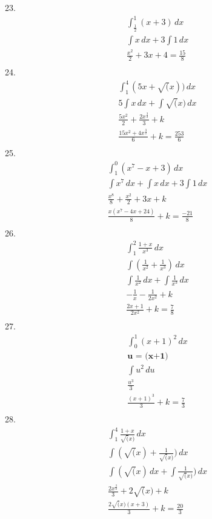 \documentclass{article}
\begin{document}
23.
\begin{gather*}
    \int_{\frac{1}{2}}^{1} (x+3)\, dx
\\
    \int x\, dx + 3\int 1\, dx
\\
    \frac{x^2}{2} + 3x + 4 = \frac{15}{8}
\\
\end{gather*}
24.
\begin{gather*}
    \int_{1}^{4} (5x + \sqrt(x))\, dx
\\
    5\int x\, dx + \int \sqrt(x)\, dx
\\
    \frac{5x^2}{2} + \frac{2x^{\frac{3}{2}}}{3} + k
\\
    \frac{15x^2 + 4x^{\frac{3}{2}}}{6} + k = \frac{253}{6}
\\
\end{gather*}
25.
\begin{gather*}
    \int_{1}^{0} (x^7 - x+3)\, dx
\\
    \int x^7\, dx + \int x\, dx + 3\int 1\,dx
\\
    \frac{x^8}{8} + \frac{x^2}{2} + 3x + k
\\
    \frac{x(x^7 - 4x + 24)}{8} + k = \frac{-21}{8}
\\
\end{gather*}
26.
\begin{gather*}
    \int_{1}^{2} \frac{1+x}{x^3}\, dx
\\
    \int ( \frac{1}{x^2} + \frac{1}{x^3} )\, dx
\\
    \int \frac{1}{x^2}\, dx + \int \frac{1}{x^3}\, dx
\\
    -\frac{1}{x} - \frac{1}{2x^2} + k
\\
    \frac {2x + 1}{2x^2} + k = \frac{7}{8}
\\
\end{gather*}
27.
\begin{gather*}
    \int_{0}^{1} (x+1)^2\, dx
\\
    \textbf{u = (x+1)}
\\
    \int u^2\, du
\\
    \frac {u^3}{3}
\\
    \frac {(x + 1)^3}{3} + k = \frac{7}{3}
\\
\end{gather*}
28.
\begin{gather*}
    \int_{1}^{4} \frac{1 + x}{\sqrt(x)}\, dx
\\
    \int (\sqrt(x) + \frac{1}{\sqrt(x)})\,dx
\\
    \int (\sqrt(x)\, dx + \int \frac{1}{\sqrt(x)})\,dx
\\
    \frac{2x^{\frac{3}{2}}}{3} + 2\sqrt(x) + k
\\
    \frac{2\sqrt(x) (x+3)}{3} + k = \frac{20}{3}
\\
\end{gather*}
\end{document}
